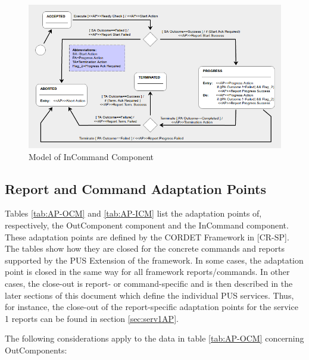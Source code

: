\documentclass[a4paper,10pt]{article}
\begin{document}
\begin{figure}[H]
 \centering
 \includegraphics[scale=0.5,keepaspectratio=true]{CrFwInCommand.png}
 \caption{Model of InCommand Component}
 \label{fig:CrFwInCommand}
\end{figure}


\subsection{Report and Command Adaptation Points}\label{sec:repCmdAP}
Tables \ref{tab:AP-OCM} and \ref{tab:AP-ICM} list the adaptation points of, respectively, the OutComponent component and the InCommand component. These adaptation points are defined by the CORDET Framework in [CR-SP]. The tables show how they are closed for the concrete commands and reports supported by the PUS Extension of the framework. In some cases, the adaptation point is closed in the same way for all framework reports/commands. In other cases, the close-out is report- or command-specific and is then described in the later sections of this document which define the individual PUS services. Thus, for instance, the close-out of the report-specific adaptation points for the service 1 reports can be found in section \ref{sec:serv1AP}. 

The following considerations apply to the data in table \ref{tab:AP-OCM} concerning OutComponents:
\end{document}
